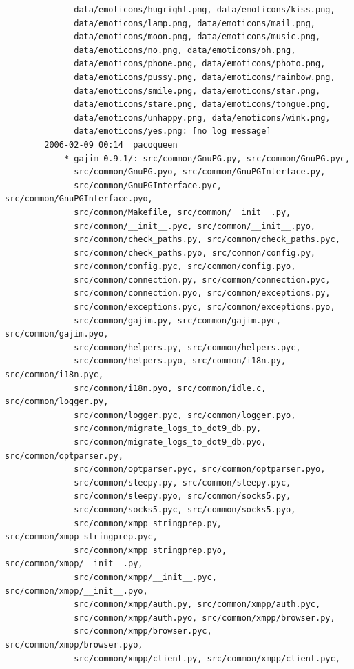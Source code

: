 \documentclass[a4paper]{article}
\begin{document}
\begin{verbatim}
              data/emoticons/hugright.png, data/emoticons/kiss.png,
              data/emoticons/lamp.png, data/emoticons/mail.png,
              data/emoticons/moon.png, data/emoticons/music.png,
              data/emoticons/no.png, data/emoticons/oh.png,
              data/emoticons/phone.png, data/emoticons/photo.png,
              data/emoticons/pussy.png, data/emoticons/rainbow.png,
              data/emoticons/smile.png, data/emoticons/star.png,
              data/emoticons/stare.png, data/emoticons/tongue.png,
              data/emoticons/unhappy.png, data/emoticons/wink.png,
              data/emoticons/yes.png: [no log message]
        2006-02-09 00:14  pacoqueen
            * gajim-0.9.1/: src/common/GnuPG.py, src/common/GnuPG.pyc,
              src/common/GnuPG.pyo, src/common/GnuPGInterface.py,
              src/common/GnuPGInterface.pyc, src/common/GnuPGInterface.pyo,
              src/common/Makefile, src/common/__init__.py,
              src/common/__init__.pyc, src/common/__init__.pyo,
              src/common/check_paths.py, src/common/check_paths.pyc,
              src/common/check_paths.pyo, src/common/config.py,
              src/common/config.pyc, src/common/config.pyo,
              src/common/connection.py, src/common/connection.pyc,
              src/common/connection.pyo, src/common/exceptions.py,
              src/common/exceptions.pyc, src/common/exceptions.pyo,
              src/common/gajim.py, src/common/gajim.pyc, src/common/gajim.pyo,
              src/common/helpers.py, src/common/helpers.pyc,
              src/common/helpers.pyo, src/common/i18n.py, src/common/i18n.pyc,
              src/common/i18n.pyo, src/common/idle.c, src/common/logger.py,
              src/common/logger.pyc, src/common/logger.pyo,
              src/common/migrate_logs_to_dot9_db.py,
              src/common/migrate_logs_to_dot9_db.pyo, src/common/optparser.py,
              src/common/optparser.pyc, src/common/optparser.pyo,
              src/common/sleepy.py, src/common/sleepy.pyc,
              src/common/sleepy.pyo, src/common/socks5.py,
              src/common/socks5.pyc, src/common/socks5.pyo,
              src/common/xmpp_stringprep.py, src/common/xmpp_stringprep.pyc,
              src/common/xmpp_stringprep.pyo, src/common/xmpp/__init__.py,
              src/common/xmpp/__init__.pyc, src/common/xmpp/__init__.pyo,
              src/common/xmpp/auth.py, src/common/xmpp/auth.pyc,
              src/common/xmpp/auth.pyo, src/common/xmpp/browser.py,
              src/common/xmpp/browser.pyc, src/common/xmpp/browser.pyo,
              src/common/xmpp/client.py, src/common/xmpp/client.pyc,

\end{verbatim}
\end{document}
